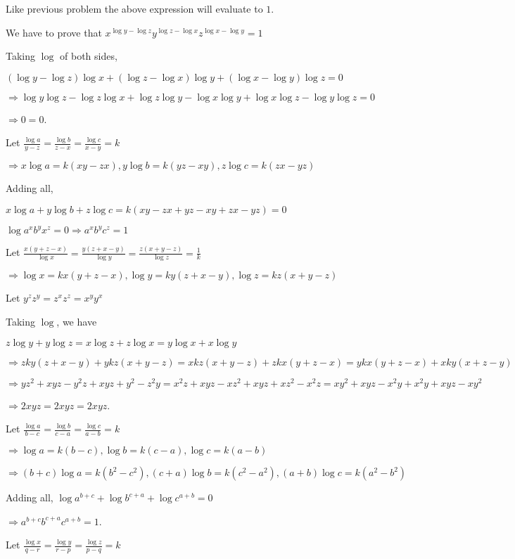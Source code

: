   Like previous problem the above expression will evaluate to $1$.
\item We have to prove that $x^{\log y - \log z}y^{\log z - \log x}z^{\log x - \log y} = 1$

  Taking $\log$ of both sides,

  $(\log y - \log z)\log x + (\log z - \log x)\log y + (\log x - \log y)\log z = 0$

  $\Rightarrow \log y\log z - \log z\log x + \log z\log y - \log x\log y + \log x\log z - \log y\log z = 0$

  $\Rightarrow 0 = 0$.
\item Let $\frac{\log a}{y - z} = \frac{\log b}{z - x} = \frac{\log c}{x - y} = k$

  $\Rightarrow x\log a = k(xy - zx), y\log b = k(yz - xy), z\log c = k(zx - yz)$

  Adding all,

  $x\log a + y\log b + z\log c = k(xy - zx + yz - xy + zx - yz) = 0$

  $\log a^xb^yx^z = 0\Rightarrow a^xb^yc^z = 1$
\item Let $\frac{x(y + z - x)}{\log x} = \frac{y(z + x - y)}{\log y} = \frac{z(x + y - z)}{\log z} = \frac{1}{k}$

  $\Rightarrow \log x = kx(y + z - x), \log y = ky(z + x - y), \log z = kz(x + y - z)$

  Let $y^zz^y = z^xz^z = x^yy^x$

  Taking $\log$, we have

  $z\log y + y\log z = x\log z + z\log x = y\log x + x\log y$

  $\Rightarrow zky(z + x - y) + ykz(x + y - z) = xkz(x + y - z) + zkx(y + z - x) = ykx(y + z - x) + xky(x + z - y)$

  $\Rightarrow yz^2 + xyz - y^2z + xyz + y^2 - z^2y = x^2z + xyz - xz^2 + xyz + xz^2 - x^2z = xy^2 + xyz - x^2y + x^2y + xyz -
  xy^2$

  $\Rightarrow 2xyz = 2xyz = 2xyz$.
\item Let $\frac{\log a}{b - c} = \frac{\log b}{c - a} = \frac{\log c}{a - b} = k$

  $\Rightarrow \log a = k(b - c), \log b = k(c - a), \log c = k(a - b)$

  $\Rightarrow (b + c)\log a = k(b^2 - c^2), (c + a)\log b = k(c^2 - a^2), (a + b)\log c = k(a^2 - b^2)$

  Adding all, $\log a^{b + c} + \log b^{c + a} + \log c^{a + b} = 0$

  $\Rightarrow a^{b + c}b^{c + a}c^{a + b} = 1$.
\item Let $\frac{\log x}{q - r} = \frac{\log y}{r - p} = \frac{\log z}{p - q} = k$

